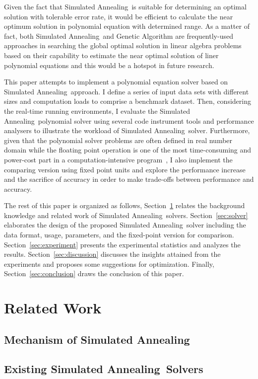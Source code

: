 \documentclass[twocolumn]{article}
\newcommand{\SA}{Simulated Annealing~}
\begin{document}
Given the fact that \SA is suitable for determining an optimal solution with tolerable error rate, it would be efficient to calculate the near optimum solution in polynomial equation with determined range. As a matter of fact, both \SA and Genetic Algorithm are frequently-used approaches in searching the global optimal solution in linear algebra problems~\cite{Chen:1998} based on their capability to estimate the near optimal solution of liner polynomial equations and this would be a hotspot in future research.

This paper attempts to implement a polynomial equation solver based on \SA approach. I define a series of input data sets with different sizes and computation loads to comprise a benchmark dataset. Then, considering the real-time running environments, I evaluate the \SA polynomial solver using several code instrument tools and performance analysers to illustrate the workload of \SA solver. Furthermore, given that the polynomial solver problems are often defined in real number domain while the floating point operation is one of the most time-consuming and power-cost part in a computation-intensive program~\cite{DaiChen:2013}, I also implement the comparing version using fixed point units and explore the performance increase and the sacrifice of accuracy in order to make trade-offs between performance and accuracy.

The rest of this paper is organized as follows, Section~\ref{sec:related} relates the background knowledge and related work of \SA solvers. Section~\ref{sec:solver} elaborates the design of the proposed \SA solver including the data format, usage, parameters, and the fixed-point version for comparison. Section~\ref{sec:experiment} presents the experimental statistics and analyzes the results. Section~\ref{sec:discussion} discusses the insights attained from the experiments and proposes some suggestions for optimization. Finally, Section~\ref{sec:conclusion} draws the conclusion of this paper.
\section{Related Work}
\label{sec:related}
\subsection{Mechanism of \SA}

\subsection{Existing \SA Solvers}
\end{document}
